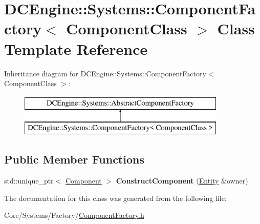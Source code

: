 \hypertarget{classDCEngine_1_1Systems_1_1ComponentFactory}{\section{D\-C\-Engine\-:\-:Systems\-:\-:Component\-Factory$<$ Component\-Class $>$ Class Template Reference}
\label{classDCEngine_1_1Systems_1_1ComponentFactory}
}
Inheritance diagram for D\-C\-Engine\-:\-:Systems\-:\-:Component\-Factory$<$ Component\-Class $>$\-:\begin{figure}[H]
\begin{center}
\leavevmode
\includegraphics[height=2.000000cm]{classDCEngine_1_1Systems_1_1ComponentFactory}
\end{center}
\end{figure}
\subsection*{Public Member Functions}
\begin{DoxyCompactItemize}
\item 
\hypertarget{classDCEngine_1_1Systems_1_1ComponentFactory_acc8f00553bfcc6599c7b74a2f7b0a98a}{std\-::unique\-\_\-ptr$<$ \hyperlink{classDCEngine_1_1Component}{Component} $>$ {\bfseries Construct\-Component} (\hyperlink{classDCEngine_1_1Entity}{Entity} \&owner)}\label{classDCEngine_1_1Systems_1_1ComponentFactory_acc8f00553bfcc6599c7b74a2f7b0a98a}

\end{DoxyCompactItemize}


The documentation for this class was generated from the following file\-:\begin{DoxyCompactItemize}
\item 
Core/\-Systems/\-Factory/\hyperlink{ComponentFactory_8h}{Component\-Factory.\-h}\end{DoxyCompactItemize}
